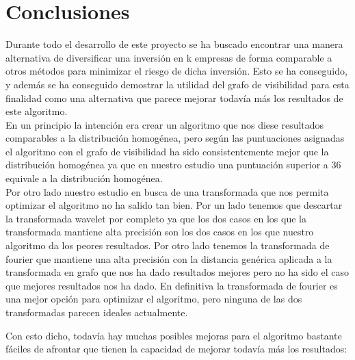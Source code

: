 \documentclass[12pt,a4paper]{article}
\begin{document}
	\section{Conclusiones}
	Durante todo el desarrollo de este proyecto se ha buscado encontrar una manera alternativa de diversificar una inversión en k empresas de forma comparable a otros métodos para minimizar el riesgo de dicha inversión. Esto se ha conseguido, y además se ha conseguido demostrar la utilidad del grafo de visibilidad para esta finalidad como una alternativa que parece mejorar todavía más los resultados de este algoritmo.\\
	En un principio la intención era crear un algoritmo que nos diese resultados comparables a la distribución homogénea, pero según las puntuaciones asignadas el algoritmo con el grafo de visibilidad ha sido consistentemente mejor que la distribución homogénea ya que en nuestro estudio una puntuación superior a 36 equivale a la distribución homogénea.\\
	Por otro lado nuestro estudio en busca de una transformada que nos permita optimizar el algoritmo no ha salido tan bien. Por un lado tenemos que descartar la transformada wavelet por completo ya que los dos casos en los que la transformada mantiene alta precisión son los dos casos en los que nuestro algoritmo da los peores resultados. Por otro lado tenemos la transformada de fourier que mantiene una alta precisión con la distancia genérica aplicada a la transformada en grafo que nos ha dado resultados mejores pero no ha sido el caso que mejores resultados nos ha dado. En definitiva la transformada de fourier es una mejor opción para optimizar el algoritmo, pero ninguna de las dos transformadas parecen ideales actualmente.
	
	Con esto dicho, todavía hay muchas posibles mejoras para el algoritmo bastante fáciles de afrontar que tienen la capacidad de mejorar todavía más los resultados:\\
	
\end{document}
